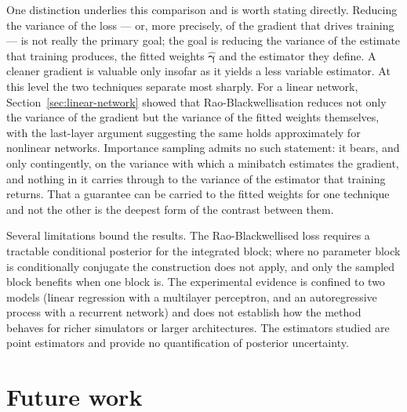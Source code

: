 One distinction underlies this comparison and is worth stating
directly. Reducing the variance of the loss --- or, more precisely, of
the gradient that drives training --- is not really the primary goal;
the goal is reducing the variance of the estimate that training
produces, the fitted weights $\hat{\bm{\gamma}}$ and the estimator they
define. A cleaner gradient is valuable only insofar as it yields a less
variable estimator. At this level the two techniques separate most
sharply. For a linear network, Section~\ref{sec:linear-network} showed
that Rao-Blackwellisation reduces not only the variance of the gradient
but the variance of the fitted weights themselves, with the last-layer
argument suggesting the same holds approximately for nonlinear
networks. Importance sampling admits no such statement: it bears, and
only contingently, on the variance with which a minibatch estimates the
gradient, and nothing in it carries through to the variance of the
estimator that training returns. That a guarantee can be carried to the
fitted weights for one technique and not the other is the deepest form
of the contrast between them.


Several limitations bound the results. The Rao-Blackwellised loss
requires a tractable conditional posterior for the integrated block;
where no parameter block is conditionally conjugate the construction
does not apply, and only the sampled block benefits when one block is.
The experimental evidence is confined to two models (linear
regression with a multilayer perceptron, and an autoregressive process
with a recurrent network) and does not establish how the method
behaves for richer simulators or larger architectures. The estimators
studied are point estimators and provide no quantification of
posterior uncertainty.

\section{Future work}
\label{sec:future-work}

